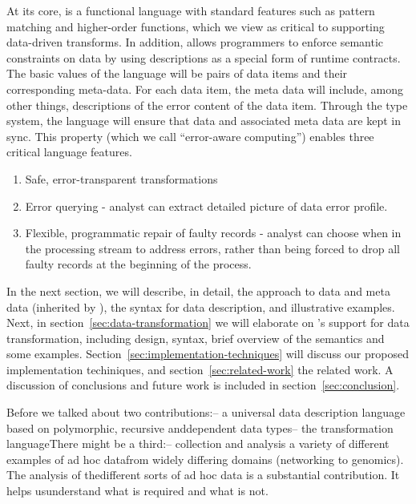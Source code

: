 At its core, \datatype{} is a functional language with standard
features such as pattern matching and higher-order functions, which we
view as critical to supporting data-driven transforms. In addition,
\datatype{} allows programmers to enforce semantic constraints on
data by using \datatype{} descriptions as a special form of runtime
contracts. The basic values of the language will be pairs of data
items and their corresponding meta-data. For each data item, the meta
data will include, among other things, descriptions of the error
content of the data item. Through the type system, the language will
ensure that data and associated meta data are kept in sync. This
property (which we call ``error-aware computing'') enables three
critical language features.
\begin{enumerate}
\item Safe, error-transparent transformations
\item Error querying - analyst can extract detailed picture of data
  error profile.
\item Flexible, programmatic repair of faulty records - analyst can
  choose when in the processing stream to address errors, rather than
  being forced to drop all faulty records at the beginning of the process.
\end{enumerate}

In the next section, we will describe, in detail, the \pads{} approach
to data and meta data (inherited by \datatype{}), the \datatype{}
syntax for data description, and illustrative examples. Next, in
section~\ref{sec:data-transformation} we will elaborate on
\datatype{}'s support for data transformation, including design,
syntax, brief overview of the semantics and some examples.
Section~\ref{sec:implementation-techniques} will discuss our proposed
implementation techiniques, and section~\ref{sec:related-work} the
related work. A discussion of conclusions and future work is included
in section~\ref{sec:conclusion}.


Before we talked about two contributions:-- a universal data
description language based on polymorphic, recursive anddependent data
types-- the transformation languageThere might be a third:--
collection and analysis a variety of different examples of ad hoc
datafrom widely differing domains (networking to genomics).  The
analysis of thedifferent sorts of ad hoc data is a substantial
contribution.  It helps usunderstand what is required and what is not.


